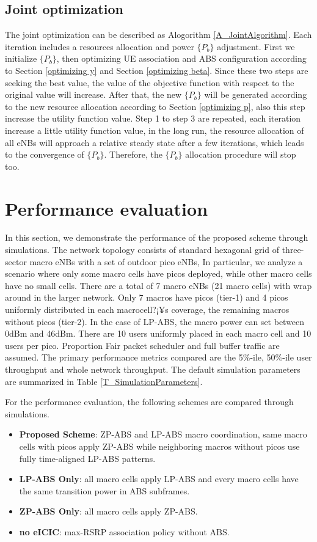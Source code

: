 \documentclass[journal]{IEEETran}
\begin{document}
\subsection{Joint optimization }\label{JointOptimization}
The joint optimization can be described as Alogorithm \ref{A_JointAlgorithm}. Each iteration includes a resources allocation and power ${ \{P_b\}}$ adjustment. First we initialize ${ \{P_b\}}$, then optimizing UE association and  ABS configuration according to Section \ref{optimizing y} and Section \ref{optimizing beta}. Since these two steps are seeking the best value, the value of the objective function with respect to the original value will increase. After that, the new ${ \{P_b\}}$ will be generated according to the new resource allocation according to Section \ref{optimizing p}, also this step increase the utility function value. Step 1 to step 3 are repeated, each iteration increase a little utility function value, in the long run, the resource allocation of all eNBs will approach a relative steady state after a few iterations, which leads to the convergence of $\{ P_b \}$. Therefore, the $\{P_b\}$ allocation procedure will stop too.

\section{Performance evaluation}\label{Section 4}
In this section, we demonstrate the performance of the proposed scheme through simulations. The network topology consists of standard hexagonal grid of three-sector macro eNBs with a set of outdoor pico eNBs, In particular, we analyze a scenario where only some macro cells have picos deployed, while other macro cells have no small cells. There are a total of 7 macro eNBs (21 macro cells) with wrap around in the larger network. Only 7 macros have picos (tier-1) and 4 picos uniformly distributed in each macrocell?¡¥s coverage, the remaining  macros without picos (tier-2). In the case of LP-ABS, the macro power can set between 0dBm and 46dBm. There are 10 users uniformly placed in each macro cell and 10 users per pico. Proportion Fair packet scheduler and full buffer traffic are assumed. The primary performance metrics compared are the 5\%-ile, 50\%-ile user throughput and whole network throughput. The default simulation parameters are summarized in Table \ref{T_SimulationParameters}.

For the performance evaluation, the following schemes are compared through simulations.

\begin{itemize}
\item \textbf{Proposed Scheme}: ZP-ABS and LP-ABS macro coordination, same macro cells with picos apply ZP-ABS while neighboring macros without picos use fully time-aligned LP-ABS patterns.
\item \textbf{LP-ABS Only}: all macro cells apply LP-ABS and every macro cells have the same transition power in ABS subframes\cite{JointABSPower}.
\item \textbf{ZP-ABS Only}: all macro cells apply ZP-ABS.
\item \textbf{no eICIC}: max-RSRP association policy without ABS.
\end{itemize}
\end{document}

